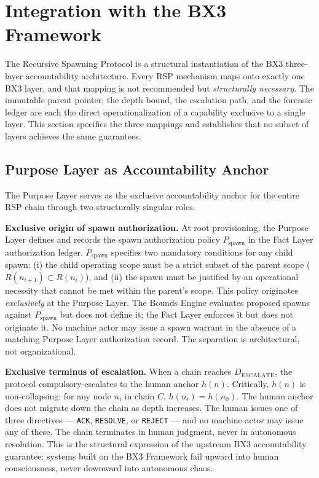 \section{Integration with the BX3 Framework}
\label{sec:rs-integration}

The Recursive Spawning Protocol is a structural instantiation of the BX3 three-layer accountability architecture. Every RSP mechanism maps onto exactly one BX3 layer, and that mapping is not recommended but \textit{structurally necessary}. The immutable parent pointer, the depth bound, the escalation path, and the forensic ledger are each the direct operationalization of a capability exclusive to a single layer. This section specifies the three mappings and establishes that no subset of layers achieves the same guarantees.

\subsection{Purpose Layer as Accountability Anchor}
\label{sec:rs-purpose-anchor}

The Purpose Layer serves as the exclusive accountability anchor for the entire RSP chain through two structurally singular roles.

\medskip
\noindent\textbf{Exclusive origin of spawn authorization.} At root provisioning, the Purpose Layer defines and records the spawn authorization policy $P_{\mathrm{spawn}}$ in the Fact Layer authorization ledger. $P_{\mathrm{spawn}}$ specifies two mandatory conditions for any child spawn: (i) the child operating scope must be a strict subset of the parent scope ($R(n_{i+1}) \subset R(n_i)$), and (ii) the spawn must be justified by an operational necessity that cannot be met within the parent's scope. This policy originates \textit{exclusively} at the Purpose Layer. The Bounds Engine evaluates proposed spawns against $P_{\mathrm{spawn}}$ but does not define it; the Fact Layer enforces it but does not originate it. No machine actor may issue a spawn warrant in the absence of a matching Purpose Layer authorization record. The separation is architectural, not organizational.

\medskip
\noindent\textbf{Exclusive terminus of escalation.} When a chain reaches $D_{\mathrm{ESCALATE}}$, the protocol compulsory-escalates to the human anchor $h(n)$. Critically, $h(n)$ is non-collapsing: for any node $n_i$ in chain $C$, $h(n_i) = h(n_0)$. The human anchor does not migrate down the chain as depth increases. The human issues one of three directives — \texttt{ACK}, \texttt{RESOLVE}, or \texttt{REJECT} — and no machine actor may issue any of these. The chain terminates in human judgment, never in autonomous resolution. This is the structural expression of the upstream BX3 accountability guarantee: systems built on the BX3 Framework fail upward into human consciousness, never downward into autonomous chaos.

